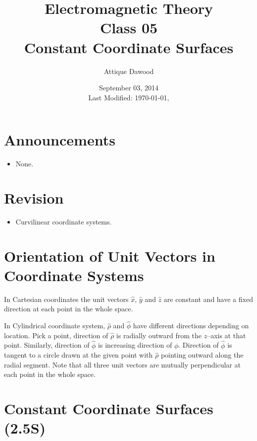 \documentclass[12pt,a4paper]{article}
\title{Electromagnetic Theory\\Class 05\\Constant Coordinate Surfaces}
\author{Attique Dawood}
\date{September 03, 2014\\[0.2cm] Last Modified: \today, \currenttime}
\begin{document}
\maketitle
\section{Announcements}
\begin{itemize}
\item None.
\end{itemize}
\section{Revision}
\begin{itemize}
\item Curvilinear coordinate systems.
\end{itemize}
\section{Orientation of Unit Vectors in Coordinate Systems}
In Cartesian coordinates the unit vectors $\hat x$, $\hat y$ and $\hat z$ are constant and have a fixed direction at each point in the whole space.

In Cylindrical coordinate system, $\hat \rho$ and $\hat \phi$ have different directions depending on location. Pick a point, direction of $\hat \rho$ is radially outward from the $z$--axis at that point. Similarly, direction of $\hat \phi$ is increasing direction of $\phi$. Direction of $\hat \phi$ is tangent to a circle drawn at the given point with $\hat \rho$ pointing outward along the radial segment. Note that all three unit vectors are mutually perpendicular at each point in the whole space.
\section{Constant Coordinate Surfaces (2.5S)}
\end{document}
